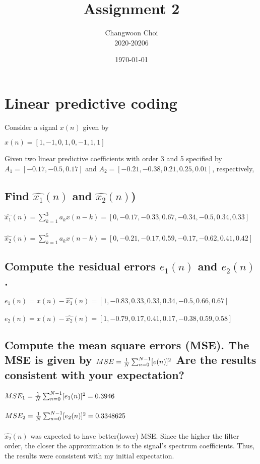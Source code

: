 \documentclass[12pt]{article}%
\begin{document}
\title{Assignment 2}
\author{Changwoon Choi \\ 2020-20206}
\date{\today}
\maketitle

\section{Linear predictive coding}
Consider a signal $x(n)$ given by \\
\begin{center}
	$x(n) = [1, -1, 0, 1, 0, -1, 1, 1]$
\end{center}
Given two linear predictive coefficients with order 3 and 5 specified by $A_1 = [-0.17, -0.5, 0.17]$ and $A_2 = [-0.21, -0.38, 0.21, 0.25, 0.01]$, respectively,
\subsection{Find $\hat{x_1}(n)$ and $\hat{x_2}(n)$)}
$\hat{x_1}(n) = \sum_{k=1}^{3} a_k x(n-k) = [0, -0.17, -0.33, 0.67, -0.34, -0.5, 0.34, 0.33]$ \\ \\
$\hat{x_2}(n) = \sum_{k=1}^{5} a_k x(n-k) = [0, -0.21, -0.17, 0.59, -0.17, -0.62, 0.41, 0.42]$

\subsection{Compute the residual errors $e_1 (n)$ and $e_2 (n)$.}
$e_1 (n) = x(n) - \hat{x_1}(n) = [1, -0.83, 0.33, 0.33, 0.34, -0.5, 0.66, 0.67]$ \\ \\
$e_2 (n) = x(n) - \hat{x_2}(n) = [1, -0.79, 0.17, 0.41, 0.17, -0.38, 0.59, 0.58]$
\subsection{Compute the mean square errors (MSE). The MSE is given by $MSE = {1 \over N} \sum_{n=0}^{N-1}[e(n)]^2$ Are the results consistent with your expectation?}
$MSE_1 = {1 \over N} \sum_{n=0}^{N-1}[e_1 (n)]^2 = 0.3946$ \\ \\
$MSE_2 = {1 \over N} \sum_{n=0}^{N-1}[e_2 (n)]^2 = 0.3348625$ \\ \\
$\hat{x_2}(n)$ was expected to have better(lower) MSE. Since the higher the filter order, the closer the approximation is to the signal's spectrum coefficients. Thus, the results were consistent with my initial expectation.
\end{document}
